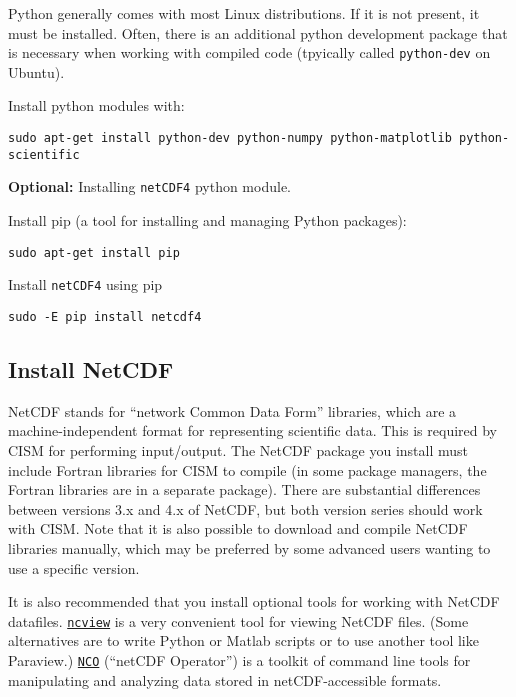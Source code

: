 \begin{mdframed}[style=ubuntu] %
Python generally comes with most Linux distributions.  If it is not present, it must be installed.
Often, there is an additional python development package that is necessary
when working with compiled code (tpyically called \texttt{python-dev} on Ubuntu).

Install python modules with:

\texttt{sudo apt-get install python-dev python-numpy python-matplotlib python-scientific}

\textbf{Optional:} Installing \texttt{netCDF4} python module.

Install pip (a tool for installing and managing Python packages):

\texttt{sudo apt-get install pip}

Install \texttt{netCDF4} using pip

\texttt{sudo -E pip install netcdf4}
\end{mdframed}                 %



\subsection{Install NetCDF}
NetCDF stands for ``network Common Data Form'' libraries, which are a
 machine-independent format for representing scientific data.
This is required by CISM for performing input/output.  The NetCDF package you 
install must include Fortran libraries for CISM to compile (in some package managers,
the Fortran libraries are in a separate package).  There are substantial differences 
between versions 3.x and 4.x of NetCDF, but both version series should work with CISM. 
Note that it is also possible to download and compile NetCDF libraries manually, 
which may be preferred by some advanced users wanting to use a specific version.

It is also recommended that you install optional tools for working with NetCDF datafiles.
\href{http://meteora.ucsd.edu/~pierce/ncview_home_page.html}{\texttt{ncview}} is a very convenient tool for viewing NetCDF files.  (Some alternatives are to write Python or Matlab scripts or to use another
tool like Paraview.)  
\href{http://nco.sourceforge.net/}{\texttt{NCO}} (``netCDF Operator'') is a toolkit of command line tools
for manipulating and analyzing data stored in netCDF-accessible formats.

